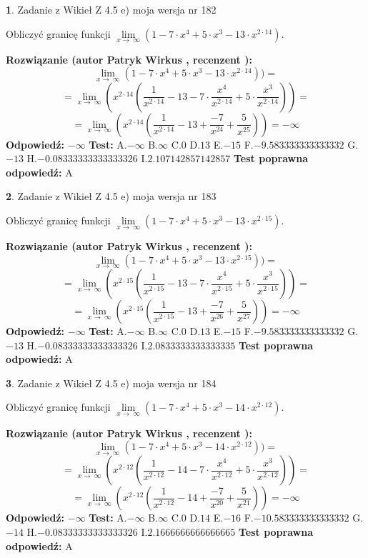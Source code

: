 \documentclass[12pt, a4paper]{article}
\theoremstyle{definition} %
\newtheorem{zad}{}
\newcommand{\zadStart}[1]{\begin{zad}#1\newline}
\newcommand{\zadStop}{\end{zad}}
\newcommand{\rozwStart}[2]{\noindent \textbf{Rozwiązanie (autor #1 , recenzent #2): }\newline}
\newcommand{\rozwStop}{\newline}
\newcommand{\odpStart}{\noindent \textbf{Odpowiedź:}\newline}
\newcommand{\odpStop}{\newline}
\newcommand{\testStart}{\noindent \textbf{Test:}\newline}
\newcommand{\testStop}{\newline}
\newcommand{\kluczStart}{\noindent \textbf{Test poprawna odpowiedź:}\newline}
\newcommand{\kluczStop}{\newline}
\begin{document}
\zadStart{Zadanie z Wikieł Z 4.5 e) moja wersja nr 182}


Obliczyć granicę funkcji  $\lim\limits_{x\to\ \infty}(1 - 7 \cdot x^{4}+5 \cdot x^{3}- 13 \cdot x^{2\cdot14})$.
\zadStop
\rozwStart{Patryk Wirkus}{}
$$\lim\limits_{x\to\ \infty}(1 - 7 \cdot x^{4}+5 \cdot x^{3}- 13 \cdot x^{2\cdot14}))=$$
$$=\lim\limits_{x\to\ \infty}(x^{2\cdot14}(\frac{1}{x^{2\cdot14}}-13 -7 \cdot \frac{x^{4}}{x^{2\cdot14}}+5 \cdot \frac{x^{3}}{x^{2\cdot14}}))=$$
$$=\lim\limits_{x\to\ \infty}(x^{2\cdot14}(\frac{1}{x^{2\cdot14}}-13 + \frac{-7}{x^{24}}+ \frac{5}{x^{25}}))=-\infty$$
\rozwStop
\odpStart
$-\infty$
\odpStop
\testStart
A.$-\infty$ B.$\infty$ C.$0$ D.$13$ E.$-15$
F.$-9.583333333333332$ G.$-13$
H.$-0.08333333333333326$
I.$2.107142857142857$
\testStop
\kluczStart
A
\kluczStop



\zadStart{Zadanie z Wikieł Z 4.5 e) moja wersja nr 183}


Obliczyć granicę funkcji  $\lim\limits_{x\to\ \infty}(1 - 7 \cdot x^{4}+5 \cdot x^{3}- 13 \cdot x^{2\cdot15})$.
\zadStop
\rozwStart{Patryk Wirkus}{}
$$\lim\limits_{x\to\ \infty}(1 - 7 \cdot x^{4}+5 \cdot x^{3}- 13 \cdot x^{2\cdot15}))=$$
$$=\lim\limits_{x\to\ \infty}(x^{2\cdot15}(\frac{1}{x^{2\cdot15}}-13 -7 \cdot \frac{x^{4}}{x^{2\cdot15}}+5 \cdot \frac{x^{3}}{x^{2\cdot15}}))=$$
$$=\lim\limits_{x\to\ \infty}(x^{2\cdot15}(\frac{1}{x^{2\cdot15}}-13 + \frac{-7}{x^{26}}+ \frac{5}{x^{27}}))=-\infty$$
\rozwStop
\odpStart
$-\infty$
\odpStop
\testStart
A.$-\infty$ B.$\infty$ C.$0$ D.$13$ E.$-15$
F.$-9.583333333333332$ G.$-13$
H.$-0.08333333333333326$
I.$2.0833333333333335$
\testStop
\kluczStart
A
\kluczStop



\zadStart{Zadanie z Wikieł Z 4.5 e) moja wersja nr 184}


Obliczyć granicę funkcji  $\lim\limits_{x\to\ \infty}(1 - 7 \cdot x^{4}+5 \cdot x^{3}- 14 \cdot x^{2\cdot12})$.
\zadStop
\rozwStart{Patryk Wirkus}{}
$$\lim\limits_{x\to\ \infty}(1 - 7 \cdot x^{4}+5 \cdot x^{3}- 14 \cdot x^{2\cdot12}))=$$
$$=\lim\limits_{x\to\ \infty}(x^{2\cdot12}(\frac{1}{x^{2\cdot12}}-14 -7 \cdot \frac{x^{4}}{x^{2\cdot12}}+5 \cdot \frac{x^{3}}{x^{2\cdot12}}))=$$
$$=\lim\limits_{x\to\ \infty}(x^{2\cdot12}(\frac{1}{x^{2\cdot12}}-14 + \frac{-7}{x^{20}}+ \frac{5}{x^{21}}))=-\infty$$
\rozwStop
\odpStart
$-\infty$
\odpStop
\testStart
A.$-\infty$ B.$\infty$ C.$0$ D.$14$ E.$-16$
F.$-10.583333333333332$ G.$-14$
H.$-0.08333333333333326$
I.$2.1666666666666665$
\testStop
\kluczStart
A
\kluczStop
\end{document}
